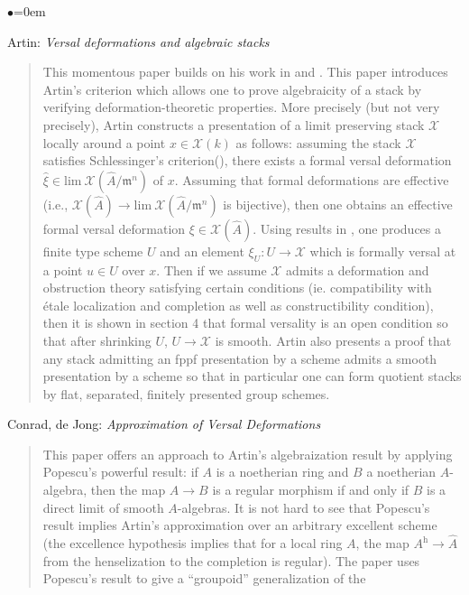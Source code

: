 \begin{list}{$\bullet$}{\leftmargin=0em}
\smallskip
\item
Artin: \emph{Versal deformations and algebraic stacks} \cite{artin_versal}
\begin{quote}
This momentous paper builds on his work in 
\cite{artin_approximation} and \cite{artin_algebraizationI}. This paper 
introduces Artin's criterion which allows one to prove algebraicity of a
stack by  verifying deformation-theoretic properties. More precisely (but
not very  precisely), Artin constructs a presentation of a limit preserving
stack  $\mathcal{X}$ 
locally around a point $x \in \mathcal{X}(k)$ as follows: assuming the stack 
$\mathcal{X}$ 
satisfies Schlessinger's criterion(\cite{Sch}), there exists a formal 
versal deformation
$\hat{\xi} \in \text{lim}\ \mathcal{X}(\hat A / \mathfrak m^n)$ of 
$x$. Assuming  that formal deformations are effective (i.e.,
$\mathcal{X}(\hat{A}) \to \text{lim}\ \mathcal{X}(\hat A  / \mathfrak m^n)$
is bijective), then one obtains an effective formal versal 
deformation $\xi \in \mathcal{X}(\hat A)$. Using results in 
\cite{artin_algebraizationI}, one produces a finite type scheme $U$ and an 
element $\xi_U: U \to \mathcal{X}$ which is formally versal at a point
$u \in U$ over $x$. Then if we assume $\mathcal{X}$ admits a deformation
and obstruction theory 
satisfying certain conditions (ie. compatibility with \'etale localization and 
completion as well as constructibility condition), then it is shown in section 
4 that formal versality is an open condition so that after shrinking $U$, $U 
\to \mathcal{X}$ is smooth.
Artin also presents a proof that any stack admitting an fppf presentation by 
a scheme admits a smooth presentation by a scheme so that in particular 
one can form quotient stacks by flat, separated, finitely presented group 
schemes.
\end{quote}
\smallskip
\item Conrad, de Jong: \emph{Approximation of Versal Deformations} 
\cite{conrad-dejong}
\begin{quote}
This paper offers an approach to Artin's algebraization result by applying 
Popescu's powerful result: if $A$ is a noetherian ring and $B$ a noetherian 
$A$-algebra, then the map $A \to B$ is a regular morphism if and only if $B$ 
is a direct limit of smooth $A$-algebras. It is not hard to see that Popescu's 
result implies Artin's approximation over an arbitrary excellent scheme (the 
excellence hypothesis implies that for a local ring $A$, the map $A^{\text{h}} 
\to \hat A$ from the henselization to the completion is regular).
The paper uses Popescu's result to give a ``groupoid'' generalization of the 

\end{quote}
\end{list}
